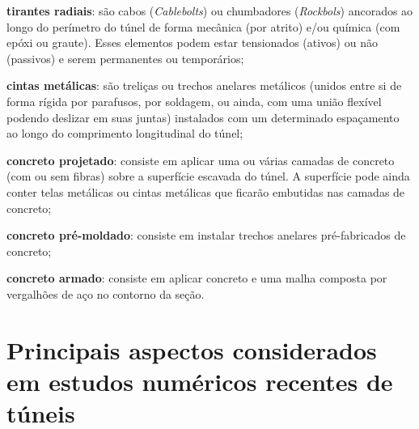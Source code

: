 \begin{alineas}
	
	\item \textbf{tirantes radiais}: são cabos (\textit{Cablebolts}) ou chumbadores (\textit{Rockbols}) ancorados ao longo do perímetro do túnel de forma mecânica (por atrito) e/ou química (com epóxi ou graute). Esses elementos podem estar tensionados (ativos) ou não (passivos) e serem permanentes ou temporários;
	
	\item \textbf{cintas metálicas}: são treliças ou trechos anelares metálicos (unidos entre si de forma rígida por parafusos, por soldagem, ou ainda, com uma união flexível podendo deslizar em suas juntas) instalados com um determinado espaçamento ao longo do comprimento longitudinal do túnel;
	
	\item \textbf{concreto projetado}: consiste em aplicar uma ou várias camadas de concreto (com ou sem fibras) sobre a superfície escavada do túnel. A superfície pode ainda conter telas metálicas ou cintas metálicas que ficarão embutidas nas camadas de concreto;
	
	\item \textbf{concreto pré-moldado}: consiste em instalar trechos anelares pré-fabricados de concreto;
	
	\item \textbf{concreto armado}: consiste em aplicar concreto e uma malha composta por vergalhões de aço no contorno da seção.
	
\end{alineas}


\section{Principais aspectos considerados em estudos numéricos recentes de túneis}




